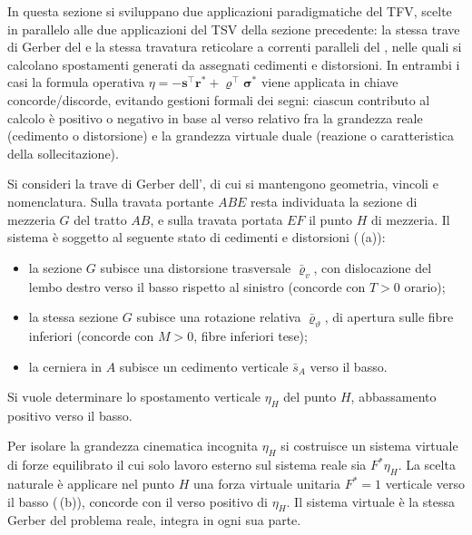 In questa sezione si sviluppano due applicazioni
paradigmatiche del TFV, scelte in parallelo alle due
applicazioni del TSV della sezione precedente:
la stessa trave di Gerber del 
 e la stessa travatura 
reticolare a correnti paralleli del 
, nelle quali si 
calcolano spostamenti generati da assegnati cedimenti 
e distorsioni. In entrambi i casi la formula operativa
$\eta = -\bm{s}^\top \bm{r}^* + \bm{\varrho}^\top
\bm{\sigma}^*$ viene applicata in chiave concorde/discorde,
evitando gestioni formali dei segni: ciascun contributo
al calcolo è positivo o negativo in base al verso
relativo fra la grandezza reale (cedimento o distorsione)
e la grandezza virtuale duale (reazione o caratteristica
della sollecitazione).



\begin{esempio}
	\label{subsec:TFV_gerber}
	
	Si consideri la trave di Gerber dell',
	di cui si mantengono geometria, vincoli e nomenclatura. Sulla 
	travata portante $ABE$ resta individuata la sezione di mezzeria 
	$G$ del tratto $AB$, e sulla travata portata $EF$ il punto $H$ 
	di mezzeria. Il sistema è soggetto al seguente stato di
	cedimenti e distorsioni (\,(a)):
	\begin{itemize}[noitemsep,topsep=2pt]
		\item la sezione $G$ subisce una distorsione trasversale 
		$\bar\varrho_v$, con dislocazione del lembo destro verso il 
		basso rispetto al sinistro (concorde con $T>0$ orario);
		\item la stessa sezione $G$ subisce una rotazione relativa 
		$\bar\varrho_\vartheta$, di apertura sulle fibre inferiori 
		(concorde con $M>0$, fibre inferiori tese);
		\item la cerniera in $A$ subisce un cedimento verticale 
		$\bar s_A$ verso il basso.
	\end{itemize}
	Si vuole determinare lo spostamento verticale $\eta_H$ del punto 
	$H$, abbassamento positivo verso il basso.
	
	\begin{svolgimento}
		
		Per isolare la grandezza cinematica incognita $\eta_H$ si costruisce 
		un sistema virtuale di forze equilibrato il cui solo lavoro esterno 
		sul sistema reale sia $F^{*}\eta_H$. La scelta naturale è applicare 
		nel punto $H$ una forza virtuale unitaria $F^{*}=1$ verticale verso 
		il basso (\,(b)), concorde con il verso 
		positivo di $\eta_H$. Il sistema virtuale è la stessa Gerber del 
		problema reale, integra in ogni sua parte.
		

\end{svolgimento}
\end{esempio}
